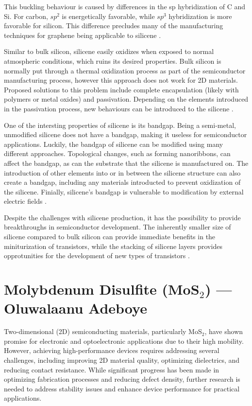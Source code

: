 \documentclass[conference]{IEEEtran}
\begin{document}
This buckling behaviour is caused by differences in the sp hybridization of C and Si. For carbon, $sp^2$ is energetically favorable, while $sp^3$ hybridization is more favorable for silicon. This difference precludes many of the manufacturing techniques for graphene being applicable to silicene \cite{oc1}.

Similar to bulk silicon, silicene easily oxidizes when exposed to normal atmospheric conditions, which ruins its desired properties. Bulk silicon is normally put through a thermal oxidization process as part of the semiconductor manufacturing process, however this approach does not work for 2D materials. Proposed solutions to this problem include complete encapsulation (likely with polymers or metal oxides) and passivation. Depending on the elements introduced in the passivation process, new behaviours can be introduced to the silicene \cite{oc2}.

One of the intersting properties of silicene is its bandgap. Being a semi-metal, unmodified silicene does not have a bandgap, making it useless for semiconductor applications. Luckily, the bandgap of silicene can be modified using many different approaches. Topological changes, such as forming nanoribbons, can affect the bandgap, as can the substrate that the silicene is manufactured on. The introduction of other elements into or in between the silicene structure can also create a bandgap, including any materials introducted to prevent oxidization of the silicene. Finially, silicene's bandgap is vulnerable to modification by external electric fields \cite{oc2}.

Despite the challenges with silicene production, it has the possibility to provide breakthroughs in semiconductor development. The inherently smaller size of silicene compared to bulk silicon can provide immediate benefits in the miniturization of transistors, while the stacking of silicene layers provides opprotunities for the development of new types of transistors \cite{oc2,oc1}.

\section{Molybdenum Disulfite (MoS$_2$) — Oluwalaanu Adeboye}

Two-dimensional (2D) semiconducting materials, particularly MoS$_2$, have shown promise for electronic and optoelectronic applications due to their high mobility. However, achieving high-performance devices requires addressing several challenges, including improving 2D material quality, optimizing dielectrics, and reducing contact resistance. While significant progress has been made in optimizing fabrication processes and reducing defect density, further research is needed to address stability issues and enhance device performance for practical applications.
\end{document}
